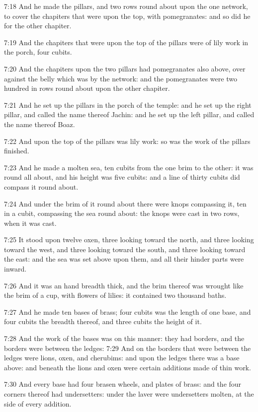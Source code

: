 7:18 And he made the pillars, and two rows round about upon the one
network, to cover the chapiters that were upon the top, with
pomegranates: and so did he for the other chapiter.

7:19 And the chapiters that were upon the top of the pillars were of
lily work in the porch, four cubits.

7:20 And the chapiters upon the two pillars had pomegranates also
above, over against the belly which was by the network: and the
pomegranates were two hundred in rows round about upon the other
chapiter.

7:21 And he set up the pillars in the porch of the temple: and he set
up the right pillar, and called the name thereof Jachin: and he set up
the left pillar, and called the name thereof Boaz.

7:22 And upon the top of the pillars was lily work: so was the work of
the pillars finished.

7:23 And he made a molten sea, ten cubits from the one brim to the
other: it was round all about, and his height was five cubits: and a
line of thirty cubits did compass it round about.

7:24 And under the brim of it round about there were knops compassing
it, ten in a cubit, compassing the sea round about: the knops were
cast in two rows, when it was cast.

7:25 It stood upon twelve oxen, three looking toward the north, and
three looking toward the west, and three looking toward the south, and
three looking toward the east: and the sea was set above upon them,
and all their hinder parts were inward.

7:26 And it was an hand breadth thick, and the brim thereof was
wrought like the brim of a cup, with flowers of lilies: it contained
two thousand baths.

7:27 And he made ten bases of brass; four cubits was the length of one
base, and four cubits the breadth thereof, and three cubits the height
of it.

7:28 And the work of the bases was on this manner: they had borders,
and the borders were between the ledges: 7:29 And on the borders that
were between the ledges were lions, oxen, and cherubims: and upon the
ledges there was a base above: and beneath the lions and oxen were
certain additions made of thin work.

7:30 And every base had four brasen wheels, and plates of brass: and
the four corners thereof had undersetters: under the laver were
undersetters molten, at the side of every addition.


